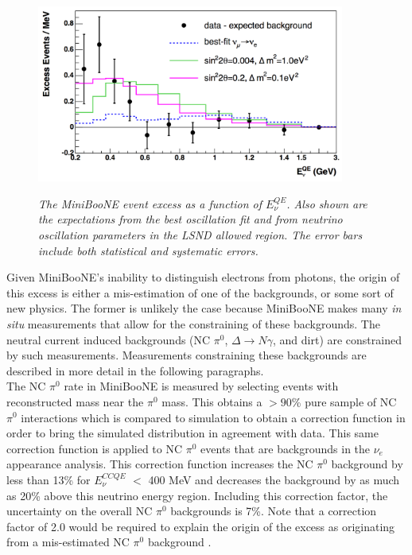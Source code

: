 \begin{figure}[ht!]
\centering
	\includegraphics[width=0.9\textwidth]{Figures/MB_published_excess_fits.png} \\
\caption{\textit{The MiniBooNE event excess as a function of $E_\nu^{QE}$. Also shown are the expectations from the best oscillation fit and from neutrino oscillation parameters in the LSND allowed region. The error bars include both statistical and systematic errors.}}\label{MB_published_excess_fits_fig}
\end{figure}

Given MiniBooNE's inability to distinguish electrons from photons, the origin of this excess is either a mis-estimation of one of the backgrounds, or some sort of new physics. The former is unlikely the case because MiniBooNE makes many \textit{in situ} measurements that allow for the constraining of these backgrounds. The neutral current induced backgrounds (NC $\pi^0$, $\Delta\rightarrow N\gamma$, and dirt) are constrained by such measurements. Measurements constraining these backgrounds are described in more detail in the following paragraphs.\\

The NC $\pi^0$ rate in MiniBooNE is measured by selecting events with reconstructed mass near the $\pi^0$ mass. This obtains a $>90$\% pure sample of NC $\pi^0$ interactions which is compared to simulation to obtain a correction function in order to bring the simulated distribution in agreement with data. This same correction function is applied to NC $\pi^0$ events that are backgrounds in the $\nu_e$ appearance analysis. This correction function increases the NC $\pi^0$ background by less than 13\% for $E_\nu^{CCQE}$ $<$ 400 MeV and decreases the background by as much as 20\% above this neutrino energy region. Including this correction factor, the uncertainty on the overall NC $\pi^0$ backgrounds is 7\%. Note that a correction factor of 2.0 would be required to explain the origin of the excess as originating from a mis-estimated NC $\pi^0$ background \cite{GeorgiaThesis}.\\

